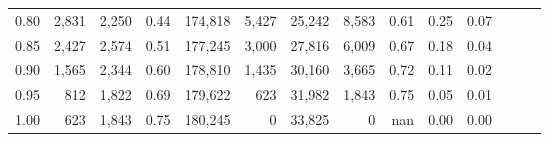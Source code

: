 \begin{tabular}{rrrrrrrrrrrrrr}
0.80 &   2,831 &  2,250 &  0.44 &  174,818 &    5,427 &  25,242 &   8,583 &  0.61 &  0.25 &      0.07 \\
0.85 &   2,427 &  2,574 &  0.51 &  177,245 &    3,000 &  27,816 &   6,009 &  0.67 &  0.18 &      0.04 \\
0.90 &   1,565 &  2,344 &  0.60 &  178,810 &    1,435 &  30,160 &   3,665 &  0.72 &  0.11 &      0.02 \\
0.95 &     812 &  1,822 &  0.69 &  179,622 &      623 &  31,982 &   1,843 &  0.75 &  0.05 &      0.01 \\
1.00 &     623 &  1,843 &  0.75 &  180,245 &        0 &  33,825 &       0 &   nan &  0.00 &      0.00 \\
\bottomrule
\end{tabular}
